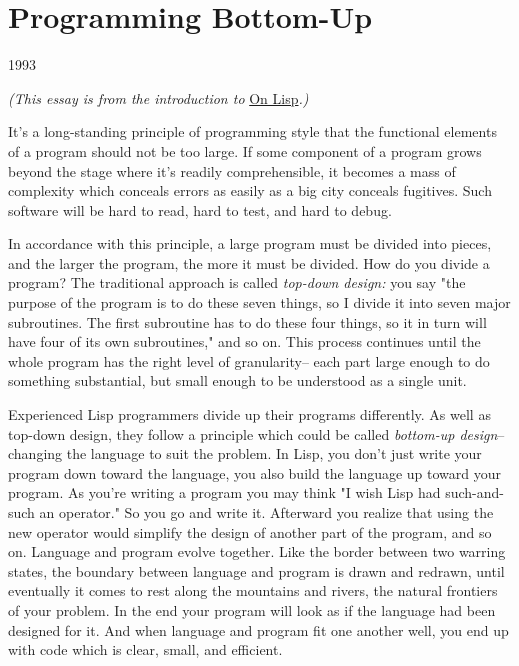 \chapter{Programming Bottom-Up}



1993

\emph{(This essay is from the introduction to }\href{http://www.paulgraham.com/onlisp.html}{On Lisp}\emph{.)}


It's a long-standing principle of programming style that the functional
elements of a program should not be too large.  If some component of a
program grows beyond the stage where it's readily comprehensible,
it becomes a mass of complexity which conceals errors as easily
as a big city conceals fugitives.  Such software will be
hard to read, hard to test, and hard to debug.

In accordance with this principle, a large program must be divided
into pieces, and the larger the program, the more it must be divided.
How do you divide a program?  The traditional approach is
called \emph{top-down design:} you say "the purpose of the
program is to do these seven things, so I divide it into seven major
subroutines.  The first subroutine has to do these four things, so
it in turn will have four of its own subroutines," and so on.
This process continues until the whole program has the right level
of granularity-- each part large enough to do something substantial,
but small enough to be understood as a single unit.

Experienced Lisp programmers divide up their programs differently.
As well as top-down design, they follow a principle which
could be called \emph{bottom-up design}-- changing the language
to suit the problem.
In Lisp, you don't just write your program down toward the language,
you also build the language up toward your program.  As you're
writing a program you may think "I wish Lisp had such-and-such an
operator." So you go and write it. Afterward
you realize that using the new operator would simplify the design  
of another part of the program, and so on.
Language and program evolve together.
Like the border between two warring states,
the boundary between language and program is drawn and redrawn,
until eventually it comes to rest along the mountains and rivers,
the natural frontiers of your problem.
In the end your program will look as if the language had been
designed for it.
And when language and
program fit one another well, you end up with code which is
clear, small, and efficient.


